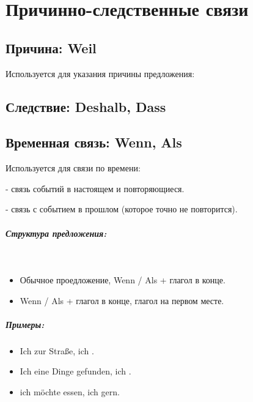 \chapter{Причинно-следственные связи}

\section{Причина: Weil}

Используется для указания причины предложения: 

\section{Следствие: Deshalb, Dass}

\section{Временная связь: Wenn, Als}

Используется для связи по времени:

 - связь событий в настоящем и повторяющиеся. 

 - связь с событием в прошлом (которое точно не повторится). 

\paragraph{Структура предложения:} ~\\
\begin{itemize}
\item Обычное проедложение, Wenn / Als + глагол в конце.
\item Wenn / Als + глагол в конце, глагол на первом месте.
\end{itemize}

\paragraph{Примеры:}
\begin{itemize}
\item Ich  zur Straße,  ich .
~\\ 
\item Ich  eine Dinge gefunden,  ich .
~\\ 
\item {} ich möchte essen,  ich gern.
~\\ 
\end{itemize}

